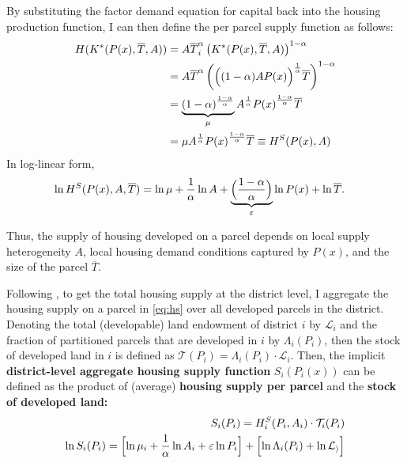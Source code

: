 \documentclass[
  12pt,
]{article}
\begin{document}
By substituting the factor demand equation for capital back into the housing production function, I can then define the per parcel supply function as follows: \[
\begin{aligned}
H(K^*(P(x), \overline{T}, A)) &= A \overline{T}^\alpha_i \left(K^*(P(x), \overline{T}, A)\right)^{1-\alpha}\\
&= A \overline{T}^\alpha \left(\Bigl((1-\alpha)AP(x)\Bigr)^{\frac{1}{\alpha}}\overline{T}\right)^{1-\alpha}\\
&=\underbrace{(1-\alpha)^{\frac{1-\alpha}{\alpha}}}_{\mu}A^{\frac{1}{\alpha}}{P(x)}^{\frac{1-\alpha}{\alpha}}\overline{T}\\
&=\mu A^{\frac{1}{\alpha}}{P(x)}^{\frac{1-\alpha}{\alpha}}\overline{T} \equiv H^S(P(x), A)
\end{aligned}
\] In log-linear form, \begin{equation}
\begin{aligned}
\ln H^S(P(x), A, \overline{T}) &= \ln \mu + \frac{1}{\alpha}\ln A + \underbrace{\Bigl(\frac{1-\alpha}{\alpha}\Bigr)}_{\varepsilon}\ln P(x) + \ln \overline{T}.
\end{aligned}
\label{eq:app-hs}
\end{equation}

Thus, the supply of housing developed on a parcel depends on local supply heterogeneity \(A\), local housing demand conditions captured by \(P(x)\), and the size of the parcel \(\overline{T}\).

Following \citet{baumsnow-han2019}, to get the total housing supply at the district level, I aggregate the housing supply on a parcel in \eqref{eq:hs} over all developed parcels in the district. Denoting the total (developable) land endowment of district \(i\) by \(\mathcal{L}_{i}\) and the fraction of partitioned parcels that are developed in \(i\) by \(\Lambda_i (P_i)\), then the stock of developed land in \(i\) is defined as \(\mathcal{T}(P_i) = \Lambda_i(P_i) \cdot \mathcal{L}_{i}\). Then, the implicit \textbf{district-level aggregate housing supply function} \(S_i(P_i(x))\) can be defined as the product of (average) \textbf{housing supply per parcel} and the \textbf{stock of developed land:} \begin{equation}
\begin{aligned}
S_i(P_i) = H_i^S(P_i, A_i)\cdot \mathcal{T}_{i}(P_i)\\ 
\ln S_i(P_i) = \Bigl[\ln \mu_i + \frac{1}{\alpha}\ln A_i + \varepsilon\ln P_i \Bigr]+ \Bigl[\ln\Lambda_i(P_i) + \ln\mathcal{L_i}\Bigr]
\end{aligned}
\label{eq:app-agg-hs}
\end{equation}
\end{document}
